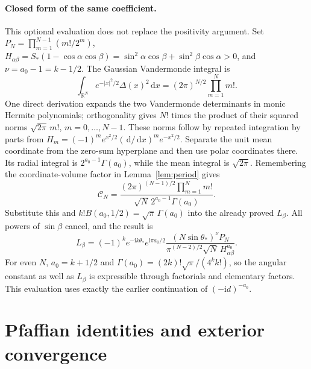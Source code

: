\documentclass[11pt]{article}
\numberwithin{equation}{section}
\theoremstyle{definition}
\newcommand{\dd}{\,\mathrm d}
\newcommand{\ii}{\mathrm i}
\newcommand{\R}{\mathbb R}
\begin{document}
\paragraph{Closed form of the same coefficient.}
This optional evaluation does not replace the positivity argument.
Set \(P_N=\prod_{m=1}^{N-1}(m!/2^m)\),
\(H_{\alpha\beta}=S_*(1-\cos\alpha\cos\beta)
=\sin^2\alpha\cos\beta+\sin^2\beta\cos\alpha>0\), and
\(\nu=a_0-1=k-1/2\). The Gaussian Vandermonde integral is
\[
 \int_{\R^N}e^{-|x|^2/2}\Delta(x)^2\dd x
 =(2\pi)^{N/2}\prod_{m=1}^N m!.
\]
One direct derivation expands the two Vandermonde determinants in
monic Hermite polynomials; orthogonality gives \(N!\) times the
product of their squared norms \(\sqrt{2\pi}\,m!\),
\(m=0,\ldots,N-1\). These norms follow by repeated integration by
parts from \(H_m=(-1)^me^{x^2/2}(\dd/\dd x)^me^{-x^2/2}\).
Separate the unit mean coordinate from the zero-sum hyperplane and
then use polar coordinates there. Its radial integral is
\(2^{a_0-1}\Gamma(a_0)\), while the mean integral is
\(\sqrt{2\pi}\). Remembering the coordinate-volume factor in
Lemma~\ref{lem:period} gives
\[
 \mathscr C_N=
 \frac{(2\pi)^{(N-1)/2}\prod_{m=1}^Nm!}
      {\sqrt N\,2^{a_0-1}\Gamma(a_0)}.
\]
Substitute this and
\(k!B(a_0,1/2)=\sqrt\pi\,\Gamma(a_0)\) into the already proved
\(L_\beta\). All powers of \(\sin\beta\) cancel, and the result is
\begin{equation}
 L_\beta=(-1)^k e^{-\ii k\theta_*}e^{\ii\pi a_0/2}
 \frac{(N\sin\theta_*)^{\nu}P_N}
 {\pi^{(N-2)/2}\sqrt N\,H_{\alpha\beta}^{a_0}}.
 \label{eq:amplitudeclosed}
\end{equation}
For even \(N\), \(a_0=k+1/2\) and
\(\Gamma(a_0)=(2k)!\sqrt\pi/(4^kk!)\), so the angular constant
as well as \(L_\beta\) is expressible through factorials and
elementary factors. This evaluation uses exactly the earlier
continuation of \((-\ii d)^{-a_0}\).



\section{Pfaffian identities and exterior convergence}\label{app:pfaffian}
\end{document}
